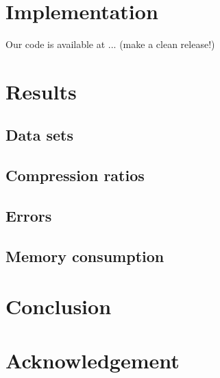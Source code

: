 \documentclass[10pt, conference, compsocconf]{IEEEtran}
\begin{document}
\section{Implementation}

Our code is available at ... (make a clean release!)

\section{Results}

\subsection{Data sets}

\subsection{Compression ratios}

\subsection{Errors}

\subsection{Memory consumption}

\section{Conclusion}

\section*{Acknowledgement}




\end{document}
